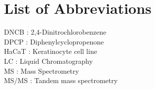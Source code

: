 \chapter*{List of Abbreviations}

DNCB : 2,4-Dinitrochlorobenzene \\
DPCP : Diphenylcyclopropenone \\
HaCaT : Keratinocyte cell line \\
LC : Liquid Chromatography \\
MS : Mass Spectrometry \\
MS/MS : Tandem mass spectrometry 